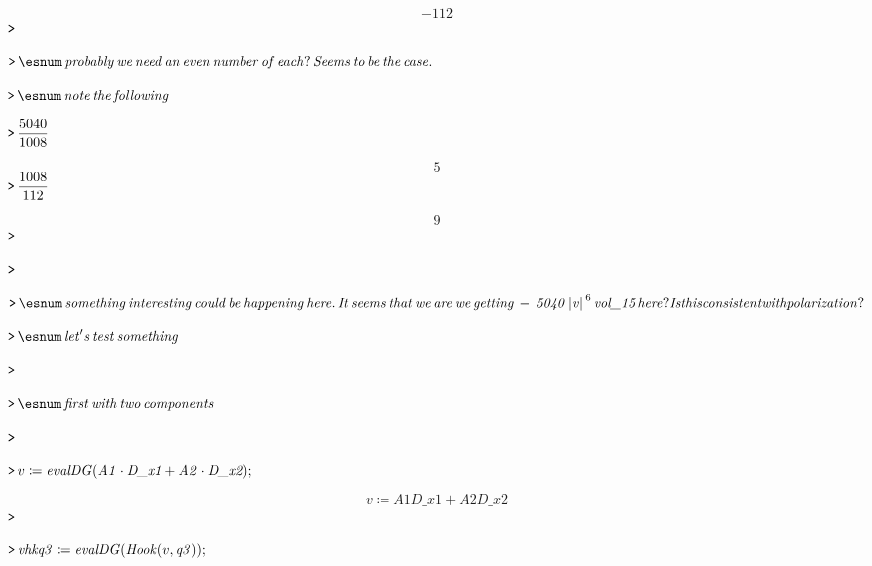 \documentclass{article}
\begin{document}
\begin{dmath}\label{(54)}
-112
\end{dmath}
\mapleinput
{$ \displaystyle \texttt{>\,} \, $}

\mapleinput
{$ \displaystyle \texttt{>\,} \esnum \mathit{\,probably\,we\,need\,an\,even\,number\,of\,each?\,Seems\,to\,be\,the\,case.\,}  $}

\mapleinput
{$ \displaystyle \texttt{>\,} \esnum \mathit{\,note\,the\,following\,}  $}

\mapleinput
{$ \displaystyle \texttt{>\,} \frac{5040}{1008} $}

\begin{dmath}\label{(55)}
5
\end{dmath}
\mapleinput
{$ \displaystyle \texttt{>\,} \frac{1008}{112} $}

\begin{dmath}\label{(56)}
9
\end{dmath}
\mapleinput
{$ \displaystyle \texttt{>\,} \, $}

\mapleinput
{$ \displaystyle \texttt{>\,} \, $}

\mapleinput
{$ \displaystyle \texttt{>\,} \esnum \mathit{\,something\,interesting\,could\,be\,happening\,here.\,It\,seems\,that\,we\,are\,we\,getting\,-\,5040\,|v|\,}^{6}\,\textit{vol\_15} \,\mathit{here} \mathit{? Is this consistent with polarization?} $}

\mapleinput
{$ \displaystyle \texttt{>\,} \esnum \mathit{\,let's\,test\,something\,}  $}

\mapleinput
{$ \displaystyle \texttt{>\,} \, $}

\mapleinput
{$ \displaystyle \texttt{>\,} \esnum \mathit{\,first\,with\,two\,components\,}  $}

\mapleinput
{$ \displaystyle \texttt{>\,} \, $}

\mapleinput
{$ \displaystyle \texttt{>\,} v \coloneqq \mathit{evalDG} (\mathit{A1} \cdot \textit{D\_x1} +\mathit{A2} \cdot \textit{D\_x2}); $}

\begin{dmath}\label{(57)}
v \coloneqq \mathit{A1} \textit{D\_x1} +\mathit{A2} \textit{D\_x2} 
\end{dmath}
\mapleinput
{$ \displaystyle \texttt{>\,} \, $}

\mapleinput
{$ \displaystyle \texttt{>\,} \mathit{vhkq3} \coloneqq \mathit{evalDG} (\mathit{Hook} (v ,\mathit{q3})); $}
\end{document}
